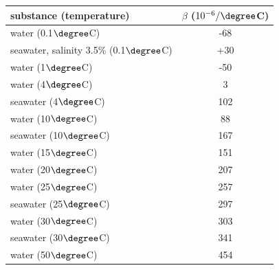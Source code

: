\begin{center}
\begin{tabular}{|l|c|}
\hline
substance (temperature) & $\beta$ ($10^{-6}/\degree$C)\\
\hline
\hline
water (0.1$\degree$C) & -68\\
\hline
seawater, salinity 3.5\% (0.1$\degree$C) & +30\\
\hline
water (1$\degree$C) & -50\\
\hline
water (4$\degree$C) & 3\\
\hline
seawater (4$\degree$C) & 102\\
\hline
water (10$\degree$C) & 88\\
\hline
seawater (10$\degree$C) & 167\\
\hline
water (15$\degree$C) & 151\\
\hline
water (20$\degree$C) & 207\\
\hline
water (25$\degree$C) & 257\\
\hline
seawater (25$\degree$C) & 297\\
\hline
water (30$\degree$C) & 303\\
\hline
seawater (30$\degree$C) & 341\\
\hline
water (50$\degree$C) & 454\\
\hline
\end{tabular}
\end{center}
%
